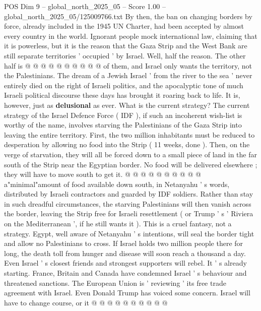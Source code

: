 \begin{textsample}{POS Dim 9 – global\_north\_2025\_05 – Score 1.00 – global\_north\_2025\_05/125009766.txt}
By then, the ban on changing borders by force, already included in the 1945 UN Charter, had been accepted by almost every country in the world.
Ignorant people mock international law, claiming that it is powerless, but it is the reason that the Gaza Strip and the West Bank are still separate territories ' occupied ' by Israel.
Well, half the reason.
The other half is @ @ @ @ @ @ @ @ @ @ of them, and Israel only wants the territory, not the Palestinians.
The dream of a Jewish Israel ' from the river to the sea ' never entirely died on the right of Israeli politics, and the apocalyptic tone of much Israeli political discourse these days has brought it roaring back to life.
It is, however, just as \textbf{delusional} as ever.
What is the current strategy?
The current strategy of the Israel Defence Force ( IDF ), if such an incoherent wish-list is worthy of the name, involves starving the Palestinians of the Gaza Strip into leaving the entire territory.
First, the two million inhabitants must be reduced to desperation by allowing no food into the Strip ( 11 weeks, done ).
Then, on the verge of starvation, they will all be forced down to a small piece of land in the far south of the Strip near the Egyptian border.
No food will be delivered elsewhere ; they will have to move south to get it. @ @ @ @ @ @ @ @ @ @ a"minimal"amount of food available down south, in Netanyahu ' s words, distributed by Israeli contractors and guarded by IDF soldiers.
Rather than stay in such dreadful circumstances, the starving Palestinians will then vanish across the border, leaving the Strip free for Israeli resettlement ( or Trump ' s ' Riviera on the Mediterranean ', if he still wants it ).
This is a cruel fantasy, not a strategy.
Egypt, well aware of Netanyahu ' s intentions, will seal the border tight and allow no Palestinians to cross.
If Israel holds two million people there for long, the death toll from hunger and disease will soon reach a thousand a day.
Even Israel ' s closest friends and strongest supporters will rebel.
It ' s already starting.
France, Britain and Canada have condemned Israel ' s behaviour and threatened sanctions.
The European Union is ' reviewing ' its free trade agreement with Israel.
Even Donald Trump has voiced some concern.
Israel will have to change course, or it @ @ @ @ @ @ @ @ @ @

\end{textsample}
